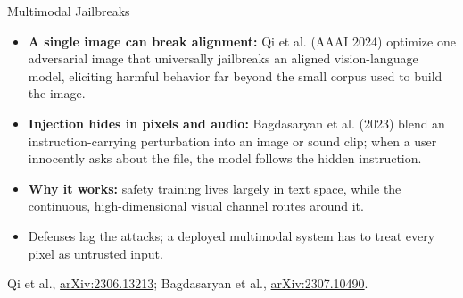 \begin{frame}{Multimodal Jailbreaks}
  \begin{itemize}
    \item[{\color{red}\textbullet}] \textbf{A single image can break alignment:} Qi et al. (AAAI 2024)
      optimize one adversarial image that universally jailbreaks an aligned vision-language model,
      eliciting harmful behavior far beyond the small corpus used to build the image.
    \item[{\color{red}\textbullet}] \textbf{Injection hides in pixels and audio:} Bagdasaryan et al.
      (2023) blend an instruction-carrying perturbation into an image or sound clip; when a user
      innocently asks about the file, the model follows the hidden instruction.
    \item[{\color{red}\textbullet}] \textbf{Why it works:} safety training lives largely in text space,
      while the continuous, high-dimensional visual channel routes around it.
    \item[{\color{red}\textbullet}] Defenses lag the attacks; a deployed multimodal system has to treat
      every pixel as untrusted input.
  \end{itemize}
  \vspace{0.4em}
  {\scriptsize Qi et al., \href{https://arxiv.org/abs/2306.13213}{arXiv:2306.13213};
  Bagdasaryan et al., \href{https://arxiv.org/abs/2307.10490}{arXiv:2307.10490}.}
\end{frame}
